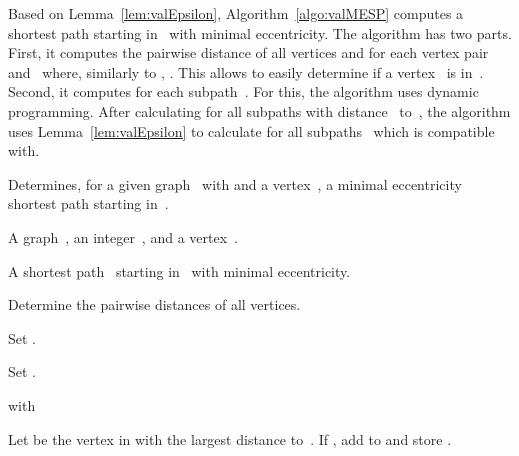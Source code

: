 \documentclass[10pt]{llncs}
\begin{document}
Based on Lemma~\ref{lem:valEpsilon}, Algorithm~\ref{algo:valMESP} computes a shortest path starting in~ with minimal eccentricity.
The algorithm has two parts.
First, it computes the pairwise distance of all vertices and  for each vertex pair  and~ where, similarly to , .
This allows to easily determine if a vertex~ is in~.
Second, it computes  for each subpath~.
For this, the algorithm uses dynamic programming.
After calculating  for all subpaths with distance~ to~, the algorithm uses Lemma~\ref{lem:valEpsilon} to calculate  for all subpaths~ which  is compatible with.

\begin{algorithm}
    [htb!]
    \caption
    {
        Determines, for a given graph~ with  and a vertex~, a minimal eccentricity shortest path starting in~.
    }
    \label{algo:valMESP}

\KwIn
{
    A graph~, an integer~, and a vertex~.
}

\KwOut
{
    A shortest path~ starting in~ with minimal eccentricity.
}

Determine the pairwise distances of all vertices.
\label{line:pairwDistance}

\ForEach
{
    
}
{
    Set .
    \label{line:defaultR}
}

\For
{
     \KwDownTo 
    \label{line:compRsStart}
}
{
    \ForEach
    {
        
    }
    {
        \ForEach
        {
            
        }
        {
            \ForEach
            {
                
            }
            {
                Set .
                \label{line:distRv}
            }
        }
    }
}

\For
{
     \KwTo 
    \label{line:QjLoop}
}
{
    \ForEach
    {
         with 
        \label{line:selectQj}
    }
    {
        \ForEach
        {
            
            \label{line:xQjLoop}
        }
        {
            Let  be the vertex in  with the largest distance to~.
            If , add  to  and store .
            \label{line:computeVsOj}
        }

        \If
        {
            
        }
        {
            
            \label{line:compStartEpsilon}
        }
        \Else
        {
            
            \label{line:QjEpsilonInf}
        }

}}
\end{algorithm}
\end{document}
